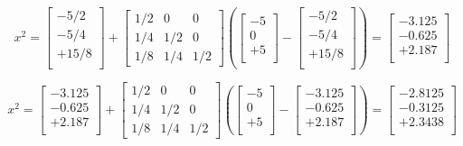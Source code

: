 \documentclass[12pt]{report}
\begin{document}
\begin{equation}
x^2 = \begin{bmatrix}
-5/2  \\
-5/4 \\
+15/8 \\
\end{bmatrix}+ \begin{bmatrix}
1/2 & 0 & 0 \\ 
1/4 & 1/2 & 0 \\ 
1/8  &  1/4 & 1/2 
\end{bmatrix} \left(\begin{bmatrix}
-5  \\
0 \\
+5 \\
\end{bmatrix} - \begin{bmatrix}
-5/2  \\
-5/4 \\
+15/8 \\
\end{bmatrix}  \right) = \begin{bmatrix}
-3.125  \\
-0.625 \\
+2.187 \\
\end{bmatrix}
\end{equation}

\begin{equation}
x^2 = \begin{bmatrix}
-3.125  \\
-0.625 \\
+2.187 \\
\end{bmatrix}+ \begin{bmatrix}
1/2 & 0 & 0 \\ 
1/4 & 1/2 & 0 \\ 
1/8  &  1/4 & 1/2 
\end{bmatrix} \left(\begin{bmatrix}
-5  \\
0 \\
+5 \\
\end{bmatrix} - \begin{bmatrix}
-3.125  \\
-0.625 \\
+2.187 \\
\end{bmatrix}  \right) = \begin{bmatrix}
 -2.8125 \\
   -0.3125 \\ 
    +2.3438\\
\end{bmatrix}
\end{equation}
\end{document}
